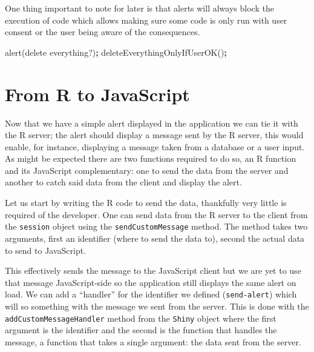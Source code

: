 \documentclass[
]{krantz}
\makeatletter
\newenvironment{Shaded}{\begin{snugshade}}{\end{snugshade}}
\newcommand{\CommentTok}[1]{\textcolor[rgb]{0.37,0.37,0.37}{\textit{#1}}}
\newcommand{\ControlFlowTok}[1]{\textcolor[rgb]{0.27,0.27,0.27}{\textbf{#1}}}
\newcommand{\DataTypeTok}[1]{\textcolor[rgb]{0.27,0.27,0.27}{#1}}
\newcommand{\KeywordTok}[1]{\textcolor[rgb]{0.27,0.27,0.27}{\textbf{#1}}}
\newcommand{\NormalTok}[1]{#1}
\newcommand{\OperatorTok}[1]{\textcolor[rgb]{0.43,0.43,0.43}{\textbf{#1}}}
\newcommand{\StringTok}[1]{\textcolor[rgb]{0.5,0.5,0.5}{#1}}
\newenvironment{kframe}{%
\medskip{}
\setlength{\fboxsep}{.8em}
 \def\at@end@of@kframe{}%
 \ifinner\ifhmode%
  \def\at@end@of@kframe{\end{minipage}}%
  \begin{minipage}{\columnwidth}%
 \fi\fi%
 \def\FrameCommand##1{\hskip\@totalleftmargin \hskip-\fboxsep
 \colorbox{shadecolor}{##1}\hskip-\fboxsep
     \hskip-\linewidth \hskip-\@totalleftmargin \hskip\columnwidth}%
 \MakeFramed {\advance\hsize-\width
   \@totalleftmargin\z@ \linewidth\hsize
   \@setminipage}}%
 {\par\unskip\endMakeFramed%
 \at@end@of@kframe}
\renewenvironment{Shaded}{\begin{kframe}}{\end{kframe}}
\makeatother
\begin{document}
One thing important to note for later is that alerts will always block the execution of code which allows making sure some code is only run with user consent or the user being aware of the consequences.

\begin{Shaded}
\begin{Highlighting}[]
\NormalTok{alert(}\StringTok{\textquotesingle{}delete everything?\textquotesingle{}}\NormalTok{)}\OperatorTok{;}
\NormalTok{deleteEverythingOnlyIfUserOK()}\OperatorTok{;}
\end{Highlighting}
\end{Shaded}

\hypertarget{from-r-to-javascript}{%
\section*{From R to JavaScript}\label{from-r-to-javascript}}


Now that we have a simple alert displayed in the application we can tie it with the R server; the alert should display a message sent by the R server, this would enable, for instance, displaying a message taken from a database or a user input. As might be expected there are two functions required to do so, an R function and its JavaScript complementary: one to send the data from the server and another to catch said data from the client and display the alert.

Let us start by writing the R code to send the data, thankfully very little is required of the developer. One can send data from the R server to the client from the \texttt{session} object using the \texttt{sendCustomMessage} method. The method takes two arguments, first an identifier (where to send the data to), second the actual data to send to JavaScript.

\begin{Shaded}
\end{Shaded}

This effectively sends the message to the JavaScript client but we are yet to use that message JavaScript-side so the application still displays the same alert on load. We can add a ``handler'' for the identifier we defined (\texttt{send-alert}) which will so something with the message we sent from the server. This is done with the \texttt{addCustomMessageHandler} method from the \texttt{Shiny} object where the first argument is the identifier and the second is the function that handles the message, a function that takes a single argument: the data sent from the server.
\end{document}
